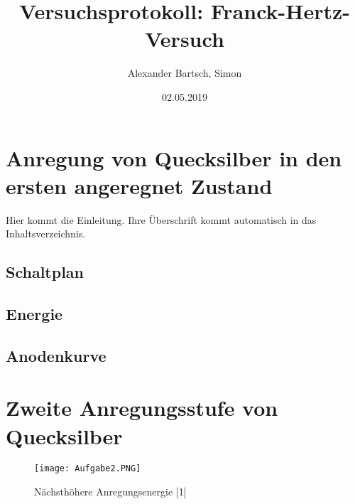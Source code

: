 \documentclass[a4paper,10pt]{scrartcl}
\title{Versuchsprotokoll: Franck-Hertz-Versuch}
\author{Alexander Bartsch, Simon }
\date{02.05.2019}
\begin{document}
\maketitle
\tableofcontents


\newpage
\section{Anregung von Quecksilber in den ersten angeregnet Zustand}
Hier kommt die Einleitung. Ihre Überschrift kommt
automatisch in das Inhaltsverzeichnis.
\newpage
\subsection{Schaltplan}
\newpage
\subsection{Energie}
\newpage
\subsection{Anodenkurve}
\newpage




\section{Zweite Anregungsstufe von Quecksilber}
\begin{figure}[h]
\begin{center}
\texttt{[image: Aufgabe2.PNG]}
\caption{Nächsthöhere Anregungsenergie [1]}
\label{Aufgabe2}
\end{center}
\end{figure}
\end{document}
